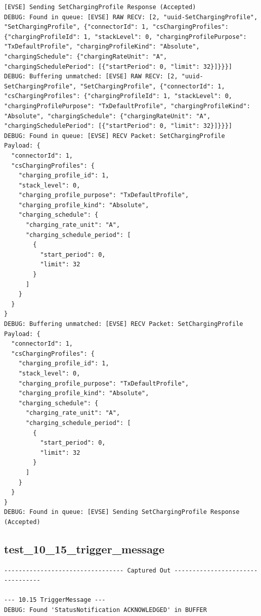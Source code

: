 \documentclass{article}
\begin{document}
\begin{lstlisting}
[EVSE] Sending SetChargingProfile Response (Accepted)
DEBUG: Found in queue: [EVSE] RAW RECV: [2, "uuid-SetChargingProfile", "SetChargingProfile", {"connectorId": 1, "csChargingProfiles": {"chargingProfileId": 1, "stackLevel": 0, "chargingProfilePurpose": "TxDefaultProfile", "chargingProfileKind": "Absolute", "chargingSchedule": {"chargingRateUnit": "A", "chargingSchedulePeriod": [{"startPeriod": 0, "limit": 32}]}}}]
DEBUG: Buffering unmatched: [EVSE] RAW RECV: [2, "uuid-SetChargingProfile", "SetChargingProfile", {"connectorId": 1, "csChargingProfiles": {"chargingProfileId": 1, "stackLevel": 0, "chargingProfilePurpose": "TxDefaultProfile", "chargingProfileKind": "Absolute", "chargingSchedule": {"chargingRateUnit": "A", "chargingSchedulePeriod": [{"startPeriod": 0, "limit": 32}]}}}]
DEBUG: Found in queue: [EVSE] RECV Packet: SetChargingProfile
Payload: {
  "connectorId": 1,
  "csChargingProfiles": {
    "charging_profile_id": 1,
    "stack_level": 0,
    "charging_profile_purpose": "TxDefaultProfile",
    "charging_profile_kind": "Absolute",
    "charging_schedule": {
      "charging_rate_unit": "A",
      "charging_schedule_period": [
        {
          "start_period": 0,
          "limit": 32
        }
      ]
    }
  }
}
DEBUG: Buffering unmatched: [EVSE] RECV Packet: SetChargingProfile
Payload: {
  "connectorId": 1,
  "csChargingProfiles": {
    "charging_profile_id": 1,
    "stack_level": 0,
    "charging_profile_purpose": "TxDefaultProfile",
    "charging_profile_kind": "Absolute",
    "charging_schedule": {
      "charging_rate_unit": "A",
      "charging_schedule_period": [
        {
          "start_period": 0,
          "limit": 32
        }
      ]
    }
  }
}
DEBUG: Found in queue: [EVSE] Sending SetChargingProfile Response (Accepted)
\end{lstlisting}
\subsection*{test\_10\_15\_trigger\_message}
\begin{lstlisting}
--------------------------------- Captured Out ---------------------------------

--- 10.15 TriggerMessage ---
DEBUG: Found 'StatusNotification ACKNOWLEDGED' in BUFFER
\end{lstlisting}
\end{document}
